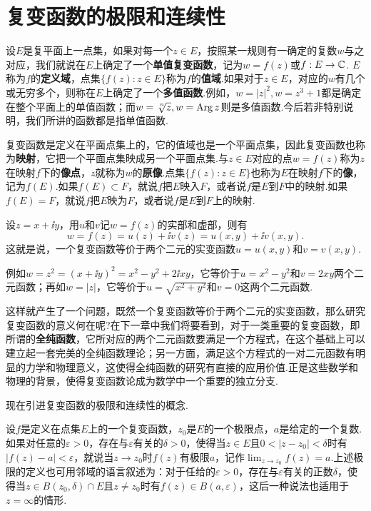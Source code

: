\section{复变函数的极限和连续性\label{sec1.7}}
设$E$是复平面上一点集，如果对每一个$z\in E$，按照某一规则有一确定的复数$w$与之对应，我们就说在$E$上确定了一个\textbf{单值复变函数}，记为$w=f(z)$或$f:E\to\mathbb C$. $E$称为$f$的\textbf{定义域}，点集$\{f(z):z\in E\}$称为$f$的\textbf{值域}.如果对于$z\in E$，对应的$w$有几个或无穷多个，则称在$E$上确定了一个\textbf{多值函数}.例如，$w=|z|^2,w=z^3+1$都是确定在整个平面上的单值函数；而$w=\sqrt[\leftroot{-1}\uproot{2} n]z,w=\Arg z$则是多值函数.今后若非特别说明，我们所讲的函数都是指单值函数.

复变函数是定义在平面点集上的，它的值域也是一个平面点集，因此复变函数也称为\textbf{映射}，它把一个平面点集映成另一个平面点集.与$z\in E$对应的点$w=f(z)$称为$z$在映射$f$下的\textbf{像点}，$z$就称为$w$的\textbf{原像}.点集$\{f(z):z\in E\}$也称为$E$在映射$f$下的\textbf{像}，记为$f(E)$.如果$f(E)\subset F$，就说$f$把$E$映入$F$，或者说$f$是$E$到$F$中的映射.如果$f(E)=F$，就说$f$把$E$映为$F$，或者说$f$是$E$到$F$上的映射.

设$z=x+\ii y$，用$u$和$v$记$w=f(z)$的实部和虚部，则有
\[
  w = f(z) = u(z)+\ii v(z) = u(x,y)+\ii v(x,y).
\]
这就是说，一个复变函数等价于两个二元的实变函数$u=u(x,y)$和$v=v(x,y)$.

例如$w=z^2=(x+\ii y)^2=x^2-y^2+2\ii xy$，它等价于$u=x^2-y^2$和$v=2xy$两个二元函数；再如$w=|z|$，它等价于$u=\sqrt{x^2+y^2}$和$v=0$这两个二元函数.

这样就产生了一个问题，既然一个复变函数等价于两个二元的实变函数，那么研究复变函数的意义何在呢?在下一章中我们将要看到，对于一类重要的复变函数，即所谓的\textbf{全纯函数}，它所对应的两个二元函数要满足一个方程式，在这个基础上可以建立起一套完美的全纯函数理论；另一方面，满足这个方程式的一对二元函数有明显的力学和物理意义，这使得全纯函数的研究有直接的应用价值.正是这些数学和物理的背景，使得复变函数论成为数学中一个重要的独立分支.

现在引进复变函数的极限和连续性的概念.

设$f$是定义在点集$E$上的一个复变函数，$z_0$是$E$的一个极限点，$a$是给定的一个复数. 如果对任意的$\varepsilon>0$，存在与$\varepsilon$有关的$\delta>0$，使得当$z\in E$且$0<|z-z_0|<\delta$时有$|f(z)-a|<\varepsilon$，就说当$z\to z_0$时$f(z)$有极限$a$，记作$\lim_{z\to z_0}f(z)=a$.上述极限的定义也可用邻域的语言叙述为：对于任给的$\varepsilon>0$，存在与$\varepsilon$有关的正数$\delta$，使得当$z\in B(z_0,\delta)\cap E$且$z\ne z_0$时有$f(z)\in B(a,\varepsilon)$，这后一种说法也适用于$z=\infty$的情形.

